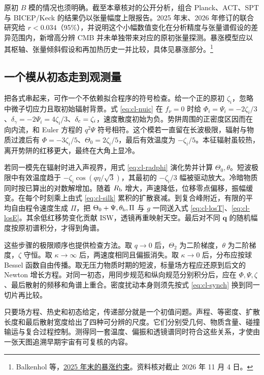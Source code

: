 原初 $B$ 模的情况也须明确。截至本章核对的公开分析，组合 Planck、ACT、SPT 与 BICEP/Keck 的结果仍以张量幅度上限报告。2025 年末、2026 年修订的联合研究给 $r<0.034$（95\%），并说明这个小幅数值变化在分析精度与张量谱假设的差异范围内，新增高分辨 CMB 并未单独带来对应的原初张量探测。暴涨模型应以其枢轴、张量倾斜假设和再加热历史一并比较，具体见暴涨部分。\footnote{Balkenhol 等，\href{https://arxiv.org/abs/2512.10613}{2025 年末的暴涨约束}。资料核对截止 2026 年 11 月 4 日。}

\subsection{一个模从初态走到观测量}

把各式串起来，可作一个不依赖拟合程序的符号检查。给一个正的原初 $\zeta_i$，忽略中微子切应力且取初始辐射背景。式 \eqref{eq:cl-nuic} 在 $f_\nu=0$ 时给 $\Phi_i=\Psi_i=-2\zeta_i/3$、$\delta_\gamma=-2\Psi_i=4\zeta_i/3$、$\delta_{\rm c}=\zeta_i$，速度散度初始为负。势阱周围的正密度区因而在向内流，和 Euler 方程的 $q^2\Psi$ 符号相符。这个模若一直留在长波极限，辐射与物质过渡后有 $\Phi=-3\zeta_i/5$、$\Theta_0=2\zeta_i/5$，最后有效温度为 $-\zeta_i/5$。本征辐射虽较热，离开势阱的红移更大，最终在大角上显冷。

若同一模先在辐射时进入声视界，用式 \eqref{eq:cl-radphi} 演化势并计算 $\Theta_0,\theta$。短波极限中有效温度趋于 $-\zeta_i\cos(q\eta/\sqrt3)$，其最初的 $-\zeta_i/3$ 幅被驱动放大。冷暗物质同时按已算出的对数解增加。随着 $R_{\rm b}$ 增大，声速降低，位移零点偏移，振幅缓变。在每个时刻乘上由式 \eqref{eq:cl-silk} 累积的扩散衰减。到复合峰附近，有限的平均自由程令速度生成 $\Pi$，把 $\Theta_0+\Psi,\theta_{\rm b},\Pi$ 与 $g$ 一同送入式 \eqref{eq:cl-losT}、\eqref{eq:cl-losE}。其余低红移势变化贡献 ISW，透镜再重映射天空。最后对不同 $\bm q$ 的随机幅度按原初谱积分，才得到角谱。

这些步骤的极限顺序也提供检查方法。取 $q\to0$ 后，$\Theta_2$ 为二阶梯度，$\theta$ 为二阶梯度，$\zeta$ 守恒。取 $\kappa\to\infty$ 后，两速度相同且偏振消失。取 $\kappa\to0$ 后，分布应按球 Bessel 函数自由传播。取无压力物质时期的短波，标量场方程应还原到后文的 Newton 增长方程。对同一初态，用同步规范和纵向规范分别积分后，应在 $\Phi,\Psi,\zeta$、最后散射的频移和角谱上重合。密度扰动本身则须先按式 \eqref{eq:cl-synch} 换到同一切片再比较。

只要场方程、热史和初态给定，传递部分就是一个初值问题。声程、等密度、扩散长度和最后散射宽度给出了四种可分辨的尺度。它们分别受几何、物质含量、碰撞输运与复合过程控制。测得同一套温度、偏振和透镜谱同时符合这些关系，才使由一张天图追溯早期宇宙有可复核的内容。

